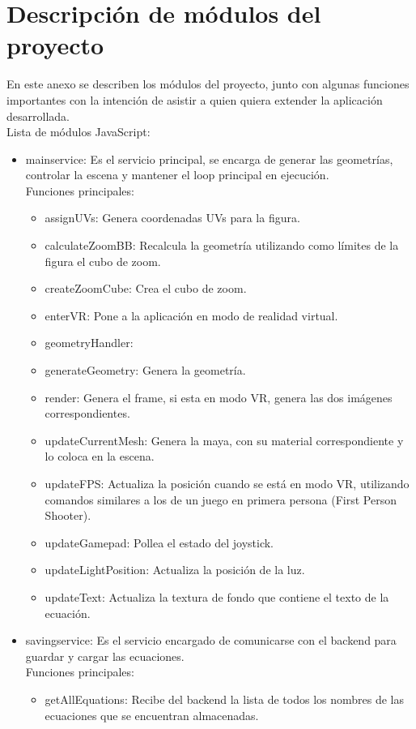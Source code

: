 \documentclass[12pt]{article}
\begin{document}
\section{Descripción de módulos del proyecto}
En este anexo se describen los módulos del proyecto, junto con algunas funciones importantes con la intención de asistir a quien quiera extender la aplicación desarrollada.
\\Lista de módulos JavaScript:
\begin{itemize}
\item mainservice: Es el servicio principal, se encarga de generar las geometrías, controlar la escena y mantener el loop principal en ejecución.
	\\Funciones principales:
	\begin{itemize}
	\item assignUVs: Genera coordenadas UVs para la figura.
	\item calculateZoomBB: Recalcula la geometría utilizando como límites de la figura el cubo de zoom.
	\item createZoomCube: Crea el cubo de zoom.
	\item enterVR: Pone a la aplicación en modo de realidad virtual.
	\item geometryHandler:
	\item generateGeometry: Genera la geometría.
	\item render: Genera el frame, si esta en modo VR, genera las dos imágenes correspondientes.
	\item updateCurrentMesh: Genera la maya, con su material correspondiente y lo coloca en la escena.
	\item updateFPS: Actualiza la posición cuando se está en modo VR, utilizando comandos similares a los de un juego en primera persona (First Person Shooter).
	\item updateGamepad: Pollea el estado del joystick.
	\item updateLightPosition: Actualiza la posición de la luz.
	\item updateText: Actualiza la textura de fondo que contiene el texto de la ecuación.
	\end{itemize}
\item savingservice: Es el servicio encargado de comunicarse con el backend para guardar y cargar las ecuaciones.
	\\Funciones principales:
	\begin{itemize}
	\item getAllEquations: Recibe del backend la lista de todos los nombres de las ecuaciones que se encuentran almacenadas.

\end{itemize}
\end{itemize}
\end{document}
